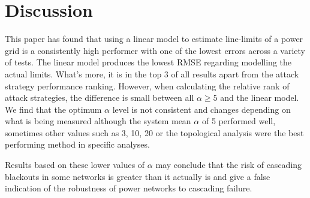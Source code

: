\documentclass{article}
\begin{document}

\fi

\section{Discussion}

This paper has found that using a linear model to estimate line-limits of a power grid is a consistently high performer with one of the lowest errors across a variety of tests. The linear model produces the lowest RMSE regarding modelling the actual limits. What's more, it is in the top 3 of all results apart from the attack strategy performance ranking. However, when calculating the relative rank of attack strategies, the difference is small between all $\alpha \geq 5$ and the linear model.
We find that the optimum $\alpha$ level is not consistent and changes depending on what is being measured although the system mean $\alpha$ of 5 performed well, sometimes other values such as 3, 10, 20 or the topological analysis were the best performing method in specific analyses. 

Results based on these lower values of $\alpha$ may conclude that the risk of cascading blackouts in some networks is greater than it actually is and give a false indication of the robustness of power networks to cascading failure. 

\end{document}
